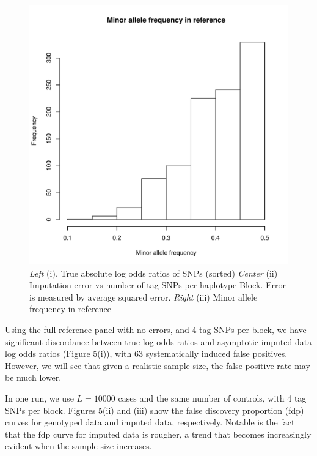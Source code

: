 \documentclass[12pt]{article}
\begin{document}
\begin{figure}[h]
\includegraphics[scale=0.25]{impute_g3.pdf}
\caption{\emph{Left} (i). True absolute log odds ratios of SNPs (sorted)  \emph{Center} (ii) Imputation error vs number of tag
  SNPs per haplotype Block.  Error is measured by average squared
  error. \emph{Right} (iii) Minor allele frequency in reference}
\end{figure}

Using the full reference panel with no errors, and 4 tag SNPs per
block, we have significant discordance between true log odds ratios
and asymptotic imputed data log odds ratios (Figure 5(i)), with 63
systematically induced false positives.
However, we will see that given a realistic sample size,
the false positive rate may be much lower.

In one run, we use $L=10000$ cases and the same number of controls,
with 4 tag SNPs per block.
Figures 5(ii) and (iii) show the false discovery proportion (fdp) curves
for genotyped data and imputed data, respectively.
Notable is the fact that the fdp curve for imputed data is rougher,
a trend that becomes increasingly evident when the sample size
increases.
\end{document}
